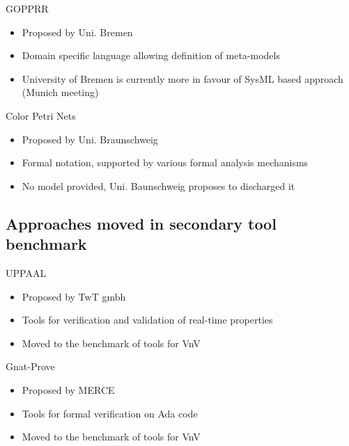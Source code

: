 \begin{frame}{GOPPRR}
 
 
\begin{itemize}
\item Proposed by Uni. Bremen
\item Domain specific language allowing definition of meta-models
\item University of
Bremen is currently more in favour of SysML based approach (Munich meeting)
\end{itemize}
 
\end{frame}


\begin{frame}{Color Petri Nets}
 

\begin{itemize}
\item Proposed by Uni. Braunschweig
\item Formal notation, supported by various formal analysis mechanisms
\item No model provided, Uni. Baunschweig proposes to discharged it
\end{itemize}
 

\end{frame}



\subsection{Approaches moved in secondary tool benchmark}


\begin{frame}{UPPAAL}
 
\begin{itemize}
\item Proposed by TwT gmbh
\item Tools for verification and validation of real-time properties
\item Moved to the benchmark of tools for VnV
\end{itemize}
 
\end{frame}


\begin{frame}{Gnat-Prove}
 
 
\begin{itemize}
\item Proposed by MERCE
\item Tools for formal verification on Ada code
\item Moved to the benchmark of tools for VnV
\end{itemize}
 

\end{frame}

